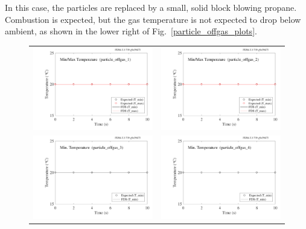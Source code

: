 \documentclass[11pt]{book}
\begin{document}
In this case, the particles are replaced by a small, solid block blowing propane. Combustion is expected, but the gas temperature is not expected to drop below ambient, as shown in the lower right of Fig.~\ref{particle_offgas_plots}.

\begin{figure}[!ht]
\begin{tabular*}{\textwidth}{lr}
\includegraphics[width=3.2in]{SCRIPT_FIGURES/particle_offgas_1} &
\includegraphics[width=3.2in]{SCRIPT_FIGURES/particle_offgas_2} \\
\includegraphics[width=3.2in]{SCRIPT_FIGURES/particle_offgas_3} &
\includegraphics[width=3.2in]{SCRIPT_FIGURES/particle_offgas_4}

\end{tabular*}
\end{figure}
\end{document}
